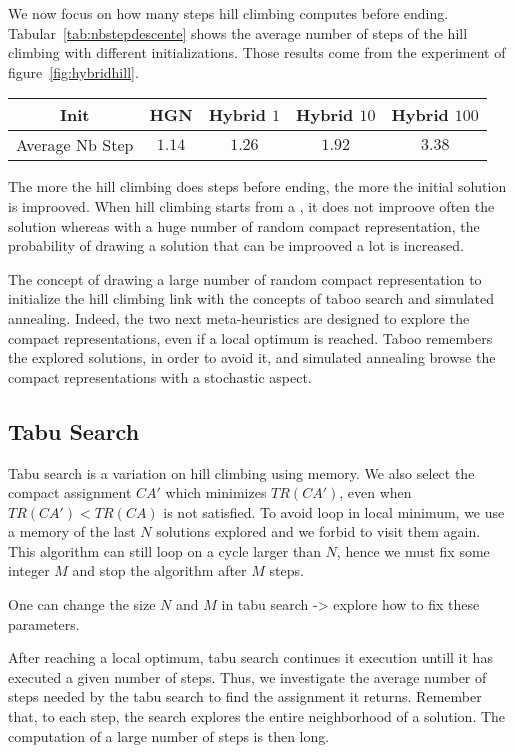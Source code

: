 We now focus on how many steps hill climbing computes before ending. Tabular~\ref{tab:nbstepdescente} shows the average number of steps of the hill climbing with different initializations. Those results come from the experiment of figure~\ref{fig:hybridhill}.

\begin{tabular}{ |c|c|c|c|c| }
\hline
    Init & HGN& Hybrid $1$& Hybrid $10$& Hybrid $100$\\
    \hline
    Average Nb Step & $1.14$ & $1.26$& $1.92$&$3.38$ \\

    \hline
 \end{tabular}
 \label{tab:nbstepdescente}

 The more the hill climbing does steps before ending, the more the initial solution is improoved. When hill climbing starts from a \hybridgreedynormalized, it does not improove often the solution whereas with a huge number of random compact representation, the probability of drawing a solution that can be improoved a lot is increased.
 
 The concept of drawing a large number of random compact representation to initialize the hill climbing link with the concepts of taboo search and simulated annealing. Indeed, the two next meta-heuristics are designed to explore the compact representations, even if a local optimum is reached. Taboo remembers the explored solutions, in order to avoid it, and simulated annealing browse the compact representations with a stochastic aspect.
\subsection{Tabu Search}

Tabu search is a variation on hill climbing using memory. We also select the compact assignment $CA'$ which minimizes 
$TR(CA')$, even when $TR(CA') < TR(CA)$ is not satisfied. To avoid loop in local minimum, we use a memory of the last 
$N$ solutions explored and we forbid to visit them again. This algorithm can still loop on a cycle larger than $N$,
hence we must fix some integer $M$ and stop the algorithm after $M$ steps.


One can change the size $N$ and $M$ in tabu search -> explore how to fix these parameters. 

After reaching a local optimum, tabu search continues it execution untill it has executed a given number of steps.
Thus, we investigate the average number of steps needed by the tabu search to find the assignment it returns. Remember that, to each step, the search explores the entire neighborhood of a solution. The computation of a large number of steps is then long.

